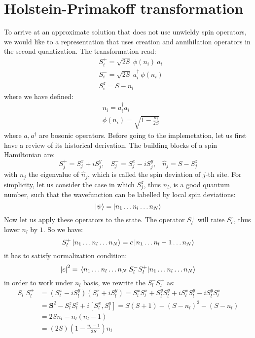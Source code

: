 \documentclass[11pt]{article}
\theoremstyle{remark}
\theoremstyle{definition}
\numberwithin{thm}{section}
\numberwithin{equation}{section}
\begin{document}
\section{Holstein-Primakoff transformation}
To arrive at an approximate solution that does not use unwieldy spin operators, we would like to a representation that uses creation and annihilation operators in the second quantization. The transformation read:
\begin{equation}
	\begin{split}
		& S_i^+ = \sqrt{2S}\:\phi(n_i)\:a_i\\
		&S_i^- = \sqrt{2S}\:a^\dagger_i \:\phi(n_i)\\
		&S_i^z = S - n_i
	\end{split}
\end{equation}
where we have defined:
\begin{equation}
	\begin{split}
		&n_i = a_i^\dagger a_i \\
		&\phi(n_i) = \sqrt{1 - \frac{n_i}{2S}}
	\end{split}
\end{equation}
where $a, a^\dagger$ are bosonic operators. Before going to the implemetation, let us first have a review of its historical derivation. The building blocks of a spin Hamiltonian are:
\begin{equation}
	S_j^+ = S_j^x + i S_j^y,\;\;\; S_j^- = S_j^x - i S_j^y,\;\;\; \hat{n}_j = S - S_j^z
\end{equation}
with $n_j$ the eigenvalue of $\hat{n}_j$, which is called the spin deviation of $j$-th site. For simplicity, let us consider the case in which $S_j^z$, thus  $n_l$, is a good quantum number, such that the wavefunction can be labelled by local spin deviations:
\begin{equation}
	 \ket{\psi} = \ket{n_1 \ldots n_l \ldots n_N}
\end{equation}
Now let us apply these operators to the state. The operator $S_l^+$ will raise  $S_l^z$, thus lower  $n_l$ by $1$. So we have:
\begin{equation}
	S_l^+ \ket{n_1\ldots n_l \ldots n_N} = c\ket{n_1\ldots n_l - 1 \ldots n_N}	
\end{equation}
it has to satisfy normalization condition:
\begin{equation}
	\abs{c}^2 = \mel{n_1\ldots n_l \ldots n_N}{S_l^- S_l^+}{n_1\ldots n_l \ldots n_N}
\end{equation}
in order to work under $n_l$ basis, we rewrite the $S_l^- S_l^+$ as:
\begin{equation}
	\begin{split}
		S_l^- S_l^+ &= (S_l^x - iS_l^y)(S_l^x + i S_l^y) = S_l^x S_l^x + S_l^y S_l^y + iS_l^x S_l^y - iS_l^y S_l^x\\
			    &= \textbf{S}^2 - S_l^z S_l^z + i[S_l^x, S_l^y] = S(S+1) - (S - n_l)^2 - (S - n_l)\\
			    &= 2Sn_l - n_l(n_l - 1) \\
			    &= (2S)\left( 1 - \frac{n_l - 1}{2S} \right) n_l
	\end{split}	
\end{equation}
\end{document}
